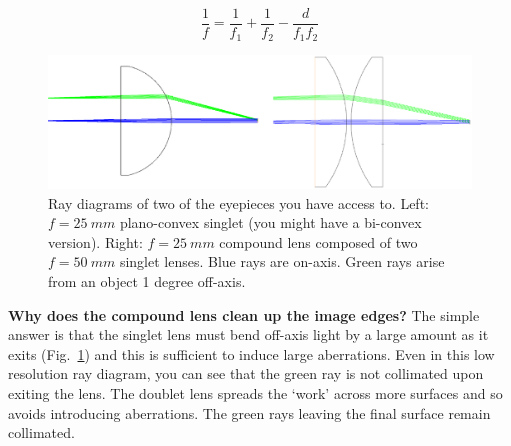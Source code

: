\documentclass[a4paper]{report}
\begin{document}
\begin{equation}
\frac{1}{f} = \frac{1}{f_1} + \frac{1}{f_2} - \frac{d}{f_1f_2}
\label{eq:compoundLensF}
\end{equation}


\begin{figure}[h]
\center
\includegraphics[width=4.5in]{eyepiece_compare.eps}
\caption{Ray diagrams of two of the eyepieces you have access to. Left: $f=25~mm$ plano-convex singlet (you might have a bi-convex version). 
Right: $f=25~mm$ compound lens composed of two $f=50~mm$ singlet lenses. 
Blue rays are on-axis. 
Green rays arise from an object 1 degree off-axis. }
\label{fig:composite}
\end{figure}


\textbf{Why does the compound lens clean up the image edges?} 
The simple answer is that the singlet lens must bend off-axis light by a large amount as it exits (Fig.~\ref{fig:composite}) and this is sufficient to induce large aberrations. 
Even in this low resolution ray diagram, you can see that the green ray is not collimated upon exiting the lens.
The doublet lens spreads the `work' across more surfaces and so avoids introducing aberrations. 
The green rays leaving the final surface remain collimated. 
\end{document}
